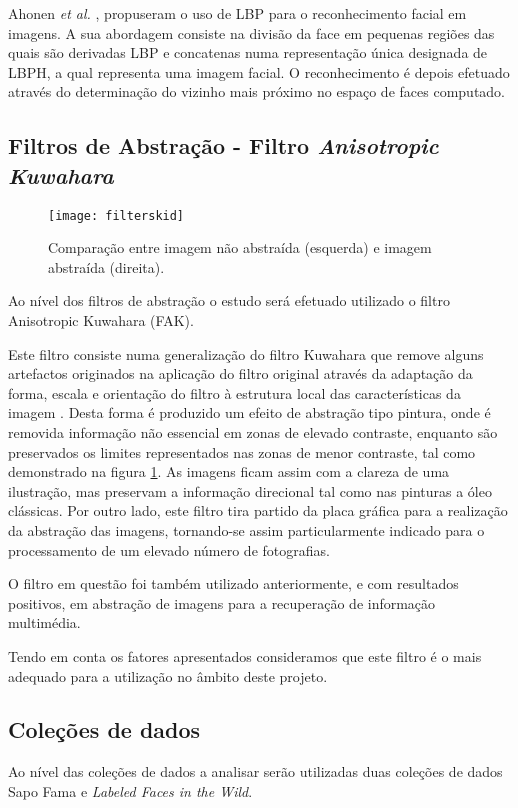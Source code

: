 Ahonen \textit{et al.} \cite{ahonen2004face}, propuseram o uso de LBP para o reconhecimento facial em imagens. A sua abordagem consiste na divisão da face em pequenas regiões das quais são derivadas LBP e concatenas numa representação única designada de LBPH, a qual representa uma imagem facial. O reconhecimento é depois efetuado através do determinação do vizinho mais próximo no espaço de faces computado.

\subsection{Filtros de Abstração - Filtro \textit{Anisotropic Kuwahara}}
\begin{figure}[ht]
  \begin{center}
    \leavevmode
    \texttt{[image: filterskid]}
    \caption{Comparação entre imagem não abstraída (esquerda) e imagem abstraída (direita).}	
    \label{fig:filterskid}
  \end{center}
\end{figure}

Ao nível dos filtros de abstração o estudo será efetuado utilizado o filtro Anisotropic Kuwahara (FAK).

Este filtro consiste numa generalização do filtro Kuwahara que remove alguns artefactos originados na aplicação do filtro original através da adaptação da forma, escala e orientação do filtro à estrutura local das características da imagem \cite{Kyprianidis2009}. Desta forma é produzido um efeito de abstração tipo pintura, onde é removida informação não essencial em zonas de elevado contraste, enquanto são preservados os limites representados nas zonas de menor contraste, tal como demonstrado na figura \ref{fig:filterskid}. As imagens ficam assim com a clareza de uma ilustração, mas preservam a informação direcional tal como nas pinturas a óleo clássicas. Por outro lado, este filtro tira partido da placa gráfica para a realização da abstração das imagens, tornando-se assim particularmente indicado para o processamento de um elevado número de fotografias.

O filtro em questão foi também utilizado anteriormente, e com resultados positivos, em abstração de imagens para a recuperação de informação multimédia. 

Tendo em conta os fatores apresentados consideramos que este filtro é o mais adequado para a utilização no âmbito deste projeto.

\subsection{Coleções de dados}
Ao nível das coleções de dados a analisar serão utilizadas duas coleções de dados Sapo Fama e \textit{Labeled Faces in the Wild}.

